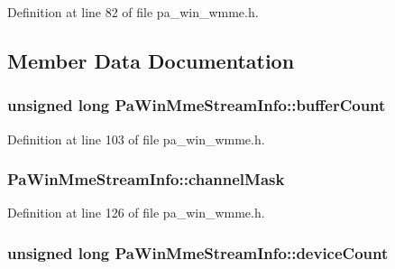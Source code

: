Definition at line 82 of file pa\+\_\+win\+\_\+wmme.\+h.



\subsection{Member Data Documentation}
\subsubsection[{\texorpdfstring{buffer\+Count}{bufferCount}}]{\setlength{\rightskip}{0pt plus 5cm}unsigned long Pa\+Win\+Mme\+Stream\+Info\+::buffer\+Count}\hypertarget{struct_pa_win_mme_stream_info_aec154a2fcc5f3267e9007b2b46d4368c}{}\label{struct_pa_win_mme_stream_info_aec154a2fcc5f3267e9007b2b46d4368c}


Definition at line 103 of file pa\+\_\+win\+\_\+wmme.\+h.

\subsubsection[{\texorpdfstring{channel\+Mask}{channelMask}}]{ Pa\+Win\+Mme\+Stream\+Info\+::channel\+Mask}\hypertarget{struct_pa_win_mme_stream_info_a8ee3a7c32e2e393826e306472a034bd1}{}\label{struct_pa_win_mme_stream_info_a8ee3a7c32e2e393826e306472a034bd1}


Definition at line 126 of file pa\+\_\+win\+\_\+wmme.\+h.

\subsubsection[{\texorpdfstring{device\+Count}{deviceCount}}]{\setlength{\rightskip}{0pt plus 5cm}unsigned long Pa\+Win\+Mme\+Stream\+Info\+::device\+Count}\hypertarget{struct_pa_win_mme_stream_info_af811daf754308ad195bdd16cefcc99dd}{}\label{struct_pa_win_mme_stream_info_af811daf754308ad195bdd16cefcc99dd}


